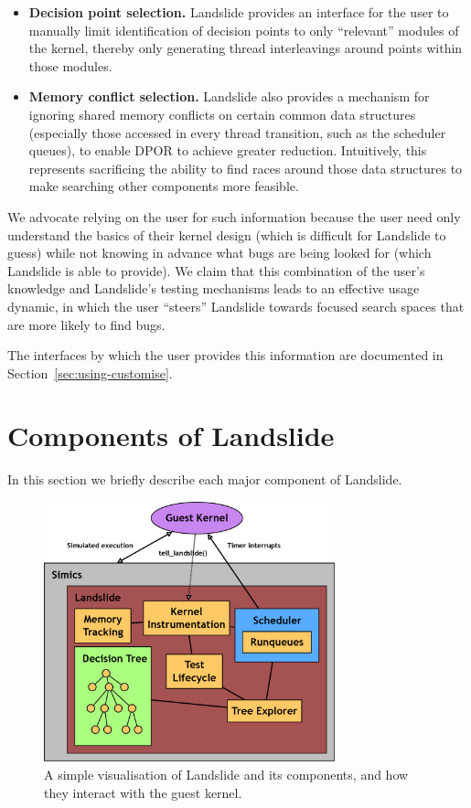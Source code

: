 {\begin{itemize}
	\item {\bf Decision point selection.} Landslide provides an interface for the user to manually limit identification of decision points to only ``relevant'' modules of the kernel, thereby only generating thread interleavings around points within those modules.
	\item {\bf Memory conflict selection.} Landslide also provides a mechanism for ignoring shared memory conflicts on certain common data structures (especially those accessed in every thread transition, such as the scheduler queues), to enable DPOR to achieve greater reduction. Intuitively, this represents sacrificing the ability to find races around those data structures to make searching other components more feasible.
\end{itemize}

We advocate relying on the user for such information because the user need only understand the basics of their kernel design (which is difficult for Landslide to guess) while not knowing in advance what bugs are being looked for (which Landslide is able to provide). We claim that this combination of the user's knowledge and Landslide's testing mechanisms leads to an effective usage dynamic, in which the user ``steers'' Landslide towards focused search spaces that are more likely to find bugs.

The interfaces by which the user provides this information are documented in Section~\ref{sec:using-customise}.
}

\section{Components of Landslide}
\label{sec:components}

In this section we briefly describe each major component of Landslide.

\begin{figure}[h]
	\centering
	\includegraphics[width=0.75\textwidth]{landslide.png}
	\caption{A simple visualisation of Landslide and its components, and how they interact with the guest kernel.}
	\label{fig:landslide}
\end{figure}

